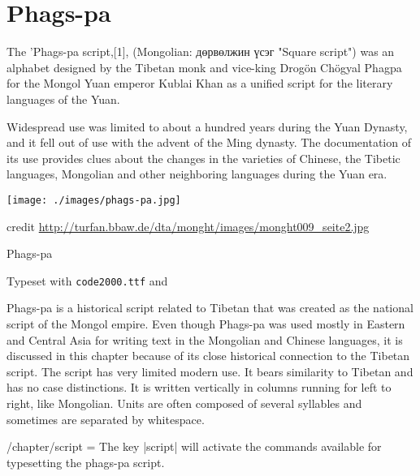\section{Phags-pa}
\label{s:phagspa}
\newfontfamily{}
\arial 
The 'Phags-pa script,[1], (Mongolian: дөрвөлжин үсэг "Square script") was an alphabet designed by the Tibetan monk and vice-king Drogön Chögyal Phagpa for the Mongol Yuan emperor Kublai Khan as a unified script for the literary languages of the Yuan.

Widespread use was limited to about a hundred years during the Yuan Dynasty, and it fell out of use with the advent of the Ming dynasty. The documentation of its use provides clues about the changes in the varieties of Chinese, the Tibetic languages, Mongolian and other neighboring languages during the Yuan era.
\medskip


\texttt{[image: ./images/phags-pa.jpg]}

credit \protect\url{http://turfan.bbaw.de/dta/monght/images/monght009_seite2.jpg}



\begin{scriptexample}[]{Phags-pa}
\bgroup
{}

\arial
\hfill Typeset with \texttt{code2000.ttf} and \cmd{\phagspa}

\egroup
\end{scriptexample}
\medskip

Phags-pa is a historical script related to Tibetan that was created as the national script of
the Mongol empire. Even though Phags-pa was used mostly in Eastern and Central Asia for
writing text in the Mongolian and Chinese languages, it is discussed in this chapter because
of its close historical connection to the Tibetan script. The script has very limited modern use. It bears similarity to Tibetan and has no case distinctions. It is written vertically in columns running for left to right, like Mongolian. Units are often composed of several syllables and sometimes are separated by whitespace.




\begin{key}{/chapter/script = } The key |script| will activate the commands available for typesetting the phags-pa script.
\end{key}



